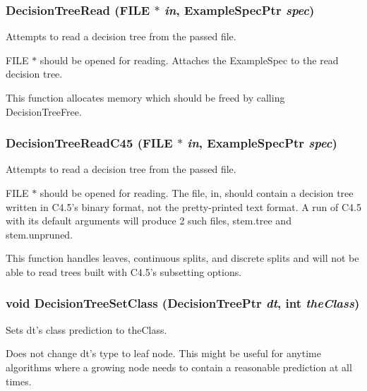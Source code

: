 \subsubsection{ Decision\-Tree\-Read (FILE $\ast$ {\em in}, {\bf Example\-Spec\-Ptr} {\em spec})}\label{DecisionTree_8h_a37}


Attempts to read a decision tree from the passed file. 

FILE $\ast$ should be opened for reading. Attaches the Example\-Spec to the read decision tree.

This function allocates memory which should be freed by calling Decision\-Tree\-Free. 
\subsubsection{ Decision\-Tree\-Read\-C45 (FILE $\ast$ {\em in}, {\bf Example\-Spec\-Ptr} {\em spec})}\label{DecisionTree_8h_a35}


Attempts to read a decision tree from the passed file. 

FILE $\ast$ should be opened for reading. The file, in, should contain a decision tree written in C4.5's binary format, not the pretty-printed text format. A run of C4.5 with its default arguments will produce 2 such files, stem.tree and stem.unpruned.

This function handles leaves, continuous splits, and discrete splits and will not be able to read trees built with C4.5's subsetting options. 
\subsubsection{\setlength{\rightskip}{0pt plus 5cm}void Decision\-Tree\-Set\-Class ({\bf Decision\-Tree\-Ptr} {\em dt}, int {\em the\-Class})}\label{DecisionTree_8h_a13}


Sets dt's class prediction to the\-Class. 

Does not change dt's type to leaf node. This might be useful for anytime algorithms where a growing node needs to contain a reasonable prediction at all times. 
